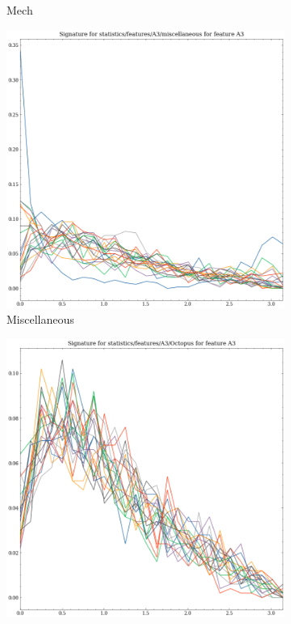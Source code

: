 \begin{figure}[ht]
\begin{subfigure}[b]{0.23\textwidth}
        \caption{Mech}
        \label{fig:features-statistics-A3-r}    
    \end{subfigure}
    \hfill
    \begin{subfigure}[b]{0.23\textwidth}
        \includegraphics[width=\textwidth]{assets/feature_extraction/A3/miscellaneous.png}
        \caption{Miscellaneous}
        \label{fig:features-statistics-A3-s}    
    \end{subfigure}
    \hfill
    \begin{subfigure}[b]{0.23\textwidth}
        \includegraphics[width=\textwidth]{assets/feature_extraction/A3/Octopus.png}

\end{subfigure}
\end{figure}
